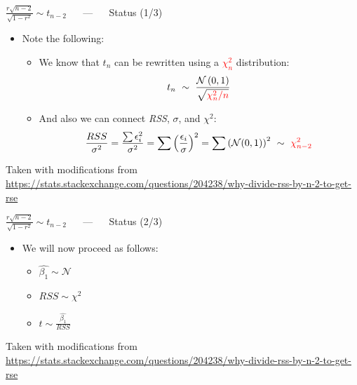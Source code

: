 \documentclass{beamer}
\begin{document}
\begin{frame}
{\centerline{$  \frac{r\sqrt{n-2}}{\sqrt{1-r^2}} \sim t_{n-2}  $  ~~ --- ~~ Status (1/3)}}

\begin{itemize}
    \item Note the following:
\begin{itemize}
    \item  We know that $t_n$ can be rewritten using a \textcolor{red}{$\chi^2_n$} distribution:
               $$t_n  ~\sim~  \frac{\mathcal{N}\left ( 0,1 \right )}{\sqrt{\textcolor{red}{\chi^2_n /n}}} $$
    \item And also we can connect \textit{RSS}, $\sigma$, and $\chi^2$:
    $$\frac{RSS}{\sigma^2} = \frac{\sum \epsilon^2_i}{\sigma^2} = \sum \left ( \frac{ \epsilon_i}{\sigma} \right )^2 = \sum \left ( \mathcal{N}(0, 1) \right )^2 ~\sim~ \textcolor{red}{\chi^2_{n-2}}$$

\end{itemize}
\end{itemize}



\vspace*{0.5cm}
\begin{center}
\tiny{Taken with modifications from \url{https://stats.stackexchange.com/questions/204238/why-divide-rss-by-n-2-to-get-rse}}
\end{center}
\end{frame}

\begin{frame}
{\centerline{$  \frac{r\sqrt{n-2}}{\sqrt{1-r^2}} \sim t_{n-2}  $  ~~ --- ~~ Status (2/3)}}

\begin{itemize}
\item We will now proceed as follows:
\begin{itemize}
\setlength\itemsep{0.5em}
\item $\hat{\beta_1} \sim \mathcal{N}$
\item $RSS \sim \chi^2$
\item $t \sim \frac{\hat{\beta_1}}{RSS}$
\end{itemize}
\end{itemize}



\vspace*{0.5cm}
\begin{center}
\tiny{Taken with modifications from \url{https://stats.stackexchange.com/questions/204238/why-divide-rss-by-n-2-to-get-rse}}
\end{center}
\end{frame}
\end{document}
